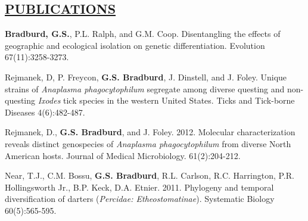 \documentclass{res}
\begin{document}
\begin{resume}
\section{\underline{PUBLICATIONS}}
\textbf{Bradburd, G.S.}, P.L. Ralph, and G.M. Coop. Disentangling the effects of geographic and ecological isolation on genetic differentiation. Evolution 67(11):3258-3273.

Rejmanek, D, P. Freycon, \textbf{G.S. Bradburd}, J. Dinstell, and J. Foley.  Unique strains of \textit{Anaplasma phagocytophilum} segregate among diverse questing and non-questing \textit{Ixodes} tick species in the western United States.  Ticks and Tick-borne Diseases 4(6):482-487.

Rejmanek, D., \textbf{G.S. Bradburd}, and J. Foley.  2012.  Molecular characterization reveals	distinct genospecies of \textit{Anaplasma phagocytophilum} from diverse North American hosts.	Journal of Medical Microbiology. 61(2):204-212.

Near, T.J., C.M. Bossu, \textbf{G.S. Bradburd}, R.L. Carlson, R.C. Harrington, P.R. Hollingsworth	Jr., B.P. Keck, D.A. Etnier. 2011.  Phylogeny and temporal diversification of darters (\textit{Percidae: Etheostomatinae}).  Systematic Biology 60(5):565-595.


\end{resume}
\end{document}
